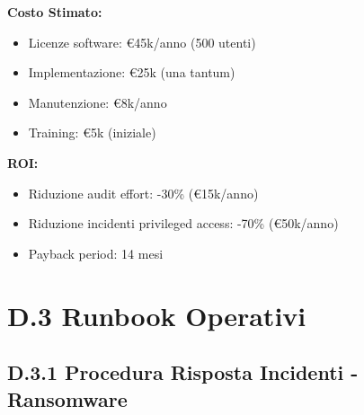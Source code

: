 \begin{tcolorbox}
\textbf{Costo Stimato:}
\begin{itemize}
    \item Licenze software: €45k/anno (500 utenti)
    \item Implementazione: €25k (una tantum)
    \item Manutenzione: €8k/anno
    \item Training: €5k (iniziale)
\end{itemize}

\textbf{ROI:}
\begin{itemize}
    \item Riduzione audit effort: -30\% (€15k/anno)
    \item Riduzione incidenti privileged access: -70\% (€50k/anno)
    \item Payback period: 14 mesi
\end{itemize}
\end{tcolorbox}

\section{D.3 Runbook Operativi}

\subsection{D.3.1 Procedura Risposta Incidenti - Ransomware}

